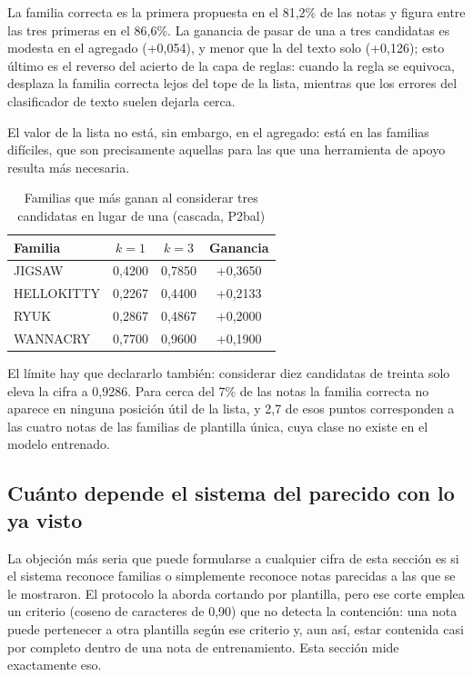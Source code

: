 La familia correcta es la primera propuesta en el 81,2\% de las notas y figura entre las tres primeras en el 86,6\%. La ganancia de pasar de una a tres candidatas es modesta en el agregado (+0,054), y menor que la del texto solo (+0,126); esto último es el reverso del acierto de la capa de reglas: cuando la regla se equivoca, desplaza la familia correcta lejos del tope de la lista, mientras que los errores del clasificador de texto suelen dejarla cerca.

El valor de la lista no está, sin embargo, en el agregado: está en las familias difíciles, que son precisamente aquellas para las que una herramienta de apoyo resulta más necesaria.

\begin{table}[ht]
\centering
\caption{Familias que más ganan al considerar tres candidatas en lugar de una (cascada, P2bal)}
\label{tab:topk_familias}
\begin{tabular}{|l|c|c|c|}
\hline
\textbf{Familia} & \textbf{$k=1$} & \textbf{$k=3$} & \textbf{Ganancia} \\
\hline
JIGSAW & 0,4200 & 0,7850 & +0,3650 \\
HELLOKITTY & 0,2267 & 0,4400 & +0,2133 \\
RYUK & 0,2867 & 0,4867 & +0,2000 \\
WANNACRY & 0,7700 & 0,9600 & +0,1900 \\
\hline
\end{tabular}
\end{table}

El límite hay que declararlo también: considerar diez candidatas de treinta solo eleva la cifra a 0,9286. Para cerca del 7\% de las notas la familia correcta no aparece en ninguna posición útil de la lista, y 2,7 de esos puntos corresponden a las cuatro notas de las familias de plantilla única, cuya clase no existe en el modelo entrenado.


\subsection{Cuánto depende el sistema del parecido con lo ya visto}
\label{subsec:res_parecido}

La objeción más seria que puede formularse a cualquier cifra de esta sección es si el sistema reconoce familias o simplemente reconoce notas parecidas a las que se le mostraron. El protocolo la aborda cortando por plantilla, pero ese corte emplea un criterio (coseno de caracteres de 0,90) que no detecta la contención: una nota puede pertenecer a otra plantilla según ese criterio y, aun así, estar contenida casi por completo dentro de una nota de entrenamiento. Esta sección mide exactamente eso.

